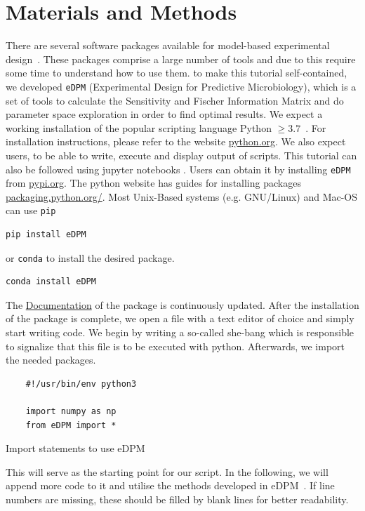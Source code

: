 \documentclass[10pt,A4paper]{article}
\begin{document}
\section*{Materials and Methods}
There are several software packages available for model-based experimental design~\cite{balsa-canto_amigo2_2016, zhang_optimal_2018, busetto_near-optimal_2013}. 
These packages comprise a large number of tools and due to this require some time to understand how to use them. to make this tutorial self-contained, we developed \texttt{eDPM} (Experimental Design for Predictive Microbiology), which is a set of tools to calculate the Sensitivity and Fischer Information Matrix and do parameter space exploration in order to find optimal results. 
We expect a working installation of the popular scripting language Python $\geq3.7$~\cite{rossumPythonLanguageReference2010}.
For installation instructions, please refer to the website \href{https://www.python.org/downloads/}{python.org}. 
We also expect users, to be able to write, execute and display output of scripts. 
This tutorial can also be followed using jupyter notebooks \cite{jupyterteamJupyterNotebook}.
Users can obtain it by installing \texttt{eDPM} from \href{https://pypi.org/project/FisInMa/0.0.1/}{pypi.org}.
The python website has guides for installing packages \href{https://packaging.python.org/en/latest/tutorials/installing-packages/}{packaging.python.org/}.
Most Unix-Based systems (e.g. GNU/Linux) and Mac-OS can use \texttt{pip}
\begin{verbatim}
pip install eDPM
\end{verbatim}
or \texttt{conda} to install the desired package.
\begin{verbatim}
conda install eDPM
\end{verbatim}
The \href{https://spatial-systems-biology-freiburg.github.io/Fishi/}{Documentation} of the package is continuously updated.
After the installation of the package is complete, we open a file with a text editor of choice and simply start writing code.
We begin by writing a so-called she-bang which is responsible to signalize that this file is to be executed with python.
Afterwards, we import the needed packages.
\begin{code}[h]
    \begin{verbatim}
    #!/usr/bin/env python3

    import numpy as np
    from eDPM import *
    \end{verbatim}
    \caption{Import statements to use eDPM}
    \label{code:import_statements}
\end{code}
This will serve as the starting point for our script. 
In the following, we will append more code to it and utilise the methods developed in eDPM~\cite{edpm2023}.
If line numbers are missing, these should be filled by blank lines for better readability.
%
%
\end{document}
